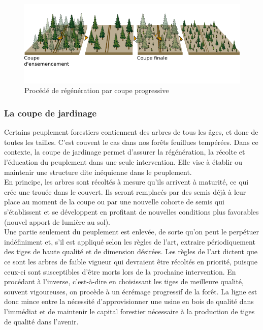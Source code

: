 \begin{figure}[!h]
\centering
\includegraphics[width=1\linewidth]{./img/ch8_CPI}
\caption{ Procédé de régénération par coupe progressive}
\label{fig:cprog}
\end{figure}


\subsubsection{La coupe de jardinage}

Certains peuplement forestiers contiennent des arbres de tous les âges, et donc de toutes les tailles. C'est couvent le cas dans nos forêts feuillues tempérées. Dans ce contexte, la coupe de jardinage permet d'assurer la régénération, la récolte et l'éducation du peuplement dans une seule intervention. Elle vise à établir ou maintenir une structure dite \og inéquienne \fg dans le peuplement.\\

En principe, les arbres sont récoltés à mesure qu'ils arrivent à maturité, ce qui crée une trouée dans le couvert. Ils seront remplacés par des semis déjà à leur place au moment de la coupe ou par une nouvelle cohorte de semis qui s'établissent et se développent en profitant de nouvelles conditions plus favorables (nouvel apport de lumière au sol).\\

Une partie seulement du peuplement est enlevée, de sorte qu'on peut le perpétuer indéfiniment et, s'il est appliqué selon les règles de l'art, extraire périodiquement des tiges de haute qualité et de dimension désirées. Les règles de l'art dictent que ce sont les arbres de faible vigueur qui devraient être récoltés en priorité, puisque ceux-ci sont susceptibles d'être morts lors de la prochaine intervention. En procédant à l'inverse, c'est-à-dire en choisissant les tiges de meilleure qualité, souvent vigoureuses, on procède à un écrémage progressif de la forêt. La ligne est donc mince entre la nécessité d'approvisionner une usine en bois de qualité dans l'immédiat et de maintenir le capital forestier nécessaire à la production de tiges de qualité dans l'avenir.\\
	
